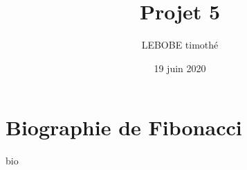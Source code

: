 \documentclass{article}
\title{Projet 5}
\author{LEBOBE timothé}
\date{19 juin 2020}
\begin{document}
    \maketitle
    \tableofcontents

    \section{Biographie de Fibonacci}
    {bio}
\end{document}
